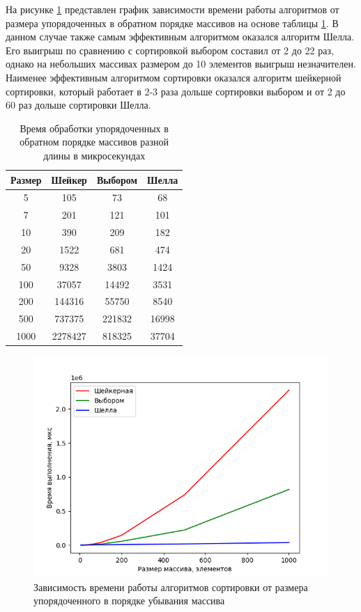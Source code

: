 \documentclass[a4paper,oneside,14pt]{extreport}
\begin{document}
На рисунке \ref{fig:reverse_arrays} представлен график зависимости времени работы алгоритмов от размера упорядоченных в обратном порядке массивов на основе таблицы \ref{tab:kontr_time}. В данном случае также  самым эффективным алгоритмом оказался алгоритм Шелла. Его выигрыш по сравнению с сортировкой выбором составил от 2 до 22 раз, однако на небольших массивах размером до 10 элементов выигрыш незначителен. Наименее эффективным алгоритмом сортировки оказался алгоритм шейкерной сортировки, который работает в 2-3 раза дольше сортировки выбором и от 2 до 60 раз дольше сортировки Шелла.
\begin{table}[H]
	\begin{center}
		\captionsetup{justification=raggedleft, singlelinecheck=false}
		\caption{\label{tab:kontr_time} Время обработки упорядоченных в обратном порядке массивов разной длины в микросекундах}
		\begin{tabular}{|c c c c|} 
			\hline
			Размер&Шейкер&Выбором&Шелла\\ [0.5ex]
			\hline
			5 &  105 &  73 &  68\\ 
			\hline
			7 &  201 &  121 &  101\\ 
			\hline
			10 &  390 &  209 &  182\\ 
			\hline
			20 &  1522 &  681 &  474\\ 
			\hline
			50 &  9328 &  3803 &  1424\\ 
			\hline
			100 &  37057 &  14492 &  3531\\ 
			\hline
			200 &  144316 &  55750 &  8540\\ 
			\hline
			500 &  737375 &  221832 &  16998\\ 
			\hline
			1000 &  2278427 &  818325 &  37704\\ 
			\hline
		\end{tabular}
	\end{center}
\end{table}

\begin{figure}[H]
	\centering
	\includegraphics[width=1\linewidth]{images/reverse_arrays}
	\caption{Зависимость времени работы алгоритмов сортировки от размера упорядоченного в порядке убывания массива}
	\label{fig:reverse_arrays}
\end{figure}
\end{document}
